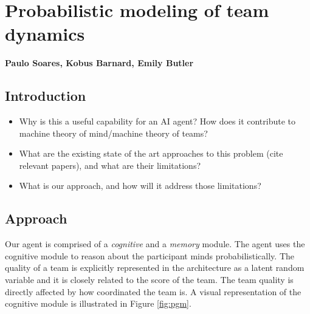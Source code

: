 \chapter{Probabilistic modeling of team dynamics}
\label{ch:pgm}
\textbf{Paulo Soares, Kobus Barnard, Emily Butler}
\section{Introduction}
\begin{itemize}
    \item Why is this a useful capability for an AI
        agent? How does it contribute to machine theory of mind/machine theory
        of teams?
    \item What are the existing state of the art approaches to this problem
        (cite relevant papers), and what are their limitations? 
    \item What is our approach, and how will it address those limitations?
\end{itemize}

\section{Approach}

Our agent is comprised of a \emph{cognitive} and a \emph{memory} module. The agent uses the cognitive module to reason about the participant minds probabilistically. The quality of a team is explicitly represented in the architecture as a latent random variable and it is closely related to the score of the team. The team quality is directly affected by how coordinated the team is. A visual representation of the cognitive module is illustrated in Figure \ref{fig:pgm}. 

